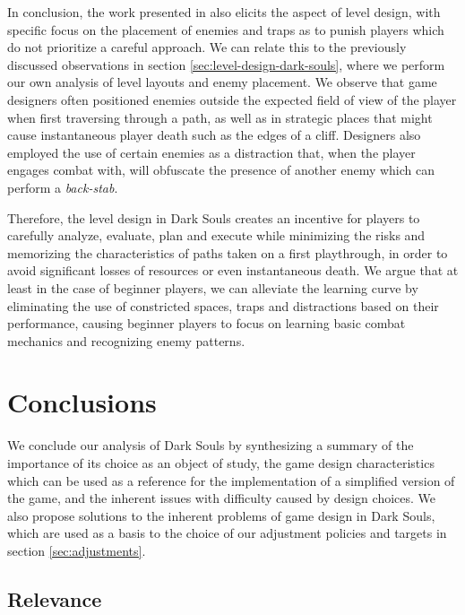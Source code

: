 In conclusion, the work presented in \cite{YT_DarkSoulsSimpleAI} also elicits the aspect of level design, with specific focus on the placement of enemies and traps as to punish players which do not prioritize a careful approach. We can relate this to the previously discussed observations in section \ref{sec:level-design-dark-souls}, where we perform our own analysis of level layouts and enemy placement. We observe that game designers often positioned enemies outside the expected field of view of the player when first traversing through a path, as well as in strategic places that might cause instantaneous player death such as the edges of a cliff. Designers also employed the use of certain enemies as a distraction that, when the player engages combat with, will obfuscate the presence of another enemy which can perform a \emph{back-stab}.

Therefore, the level design in Dark Souls creates an incentive for players to carefully analyze, evaluate, plan and execute while minimizing the risks and memorizing the characteristics of paths taken on a first playthrough, in order to avoid significant losses of resources or even instantaneous death. We argue that at least in the case of beginner players, we can alleviate the learning curve by eliminating the use of constricted spaces, traps and distractions based on their performance, causing beginner players to focus on learning basic combat mechanics and recognizing enemy patterns.

\section{Conclusions}

We conclude our analysis of Dark Souls by synthesizing a summary of the importance of its choice as an object of study, the game design characteristics which can be used as a reference for the implementation of a simplified version of the game, and the inherent issues with difficulty caused by design choices. We also propose solutions to the inherent problems of game design in Dark Souls, which are used as a basis to the choice of our adjustment policies and targets in section \ref{sec:adjustments}.

\subsection{Relevance}

